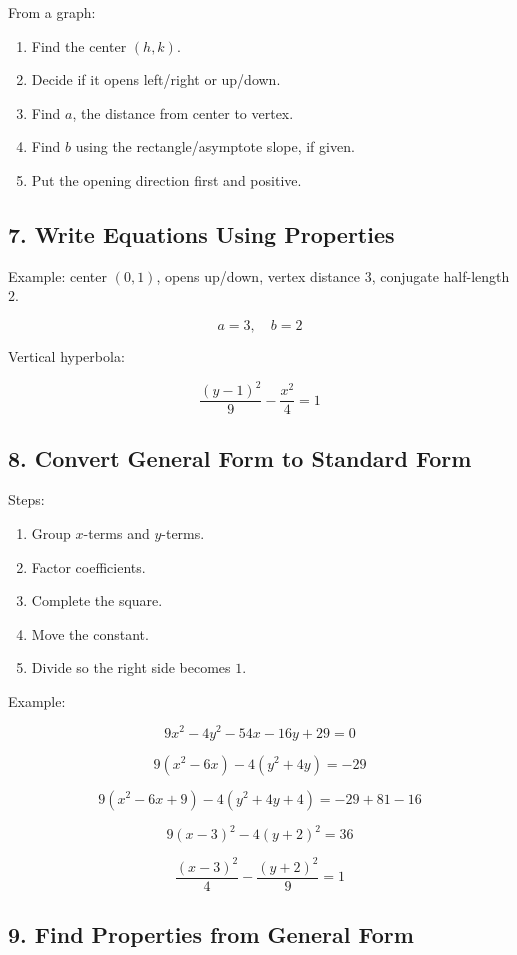 \documentclass[11pt]{article}
\begin{document}
From a graph:

\begin{enumerate}
  \item Find the center \((h,k)\).
  \item Decide if it opens left/right or up/down.
  \item Find \(a\), the distance from center to vertex.
  \item Find \(b\) using the rectangle/asymptote slope, if given.
  \item Put the opening direction first and positive.
\end{enumerate}

\subsection*{7. Write Equations Using Properties}

Example: center \((0,1)\), opens up/down, vertex distance \(3\), conjugate half-length \(2\).

\[
a=3,\quad b=2
\]

Vertical hyperbola:

\[
\frac{(y-1)^2}{9}-\frac{x^2}{4}=1
\]

\subsection*{8. Convert General Form to Standard Form}

Steps:

\begin{enumerate}
  \item Group \(x\)-terms and \(y\)-terms.
  \item Factor coefficients.
  \item Complete the square.
  \item Move the constant.
  \item Divide so the right side becomes \(1\).
\end{enumerate}

Example:

\[
9x^2-4y^2-54x-16y+29=0
\]

\[
9(x^2-6x)-4(y^2+4y)=-29
\]

\[
9(x^2-6x+9)-4(y^2+4y+4)=-29+81-16
\]

\[
9(x-3)^2-4(y+2)^2=36
\]

\[
\frac{(x-3)^2}{4}-\frac{(y+2)^2}{9}=1
\]

\subsection*{9. Find Properties from General Form}
\end{document}
